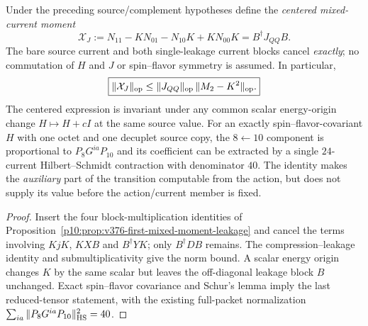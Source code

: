 \documentclass[12pt,a4paper]{article}
\begin{document}
\begin{corollary}
\label{p10:cor:v376-centered-double-leakage-current}
Under the preceding source/complement hypotheses define the
\emph{centered mixed-current moment}
\[
 \boxed{\mathcal X_J
 :=N_{11}-K N_{01}-N_{10}K+K N_{00}K
 =B^\dagger J_{QQ}B.}
\]
The bare source current and both single-leakage current blocks
cancel \emph{exactly}; no commutation of $H$ and $J$ or spin--flavor
symmetry is assumed. In particular,
\[
\boxed{\|\mathcal X_J\|_{\rm op}
 \le \|J_{QQ}\|_{\rm op}\,\|M_2-K^2\|_{\rm op}.}
\]
The centered expression is invariant under any common scalar
energy-origin change $H\mapsto H+cI$ at the same source value.
For an exactly spin--flavor-covariant $H$ with one octet and one
decuplet source copy, the $8\leftarrow10$ component is
proportional to $P_8G^{ia}P_{10}$ and its coefficient can be
extracted by a single $24$-current Hilbert--Schmidt contraction
with denominator $40$. The identity makes the \emph{auxiliary}
part of the transition computable from the action, but does not
supply its value before the action/current member is fixed.
\end{corollary}
\begin{proof}
Insert the four block-multiplication identities of
Proposition~\ref{p10:prop:v376-first-mixed-moment-leakage}
and cancel the terms involving $KjK$, $KXB$ and $B^\dagger YK$;
only $B^\dagger D B$ remains. The compression--leakage identity
and submultiplicativity give the norm bound. A scalar energy
origin changes $K$ by the same scalar but leaves the off-diagonal
leakage block $B$ unchanged. Exact spin--flavor covariance and
Schur's lemma imply the last reduced-tensor statement, with the
existing full-packet normalization
$\sum_{ia}\|P_8G^{ia}P_{10}\|_{\rm HS}^2=40$.
\end{proof}

\end{document}
